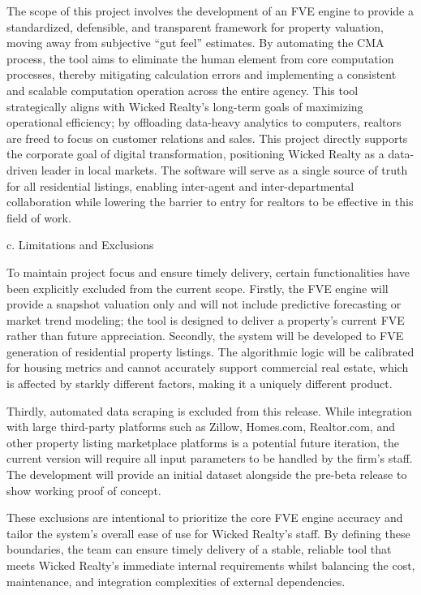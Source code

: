 \documentclass[
]{article}
\begin{document}
The scope of this project involves the development of an FVE engine to
provide a standardized, defensible, and transparent framework for
property valuation, moving away from subjective ``gut feel'' estimates.
By automating the CMA process, the tool aims to eliminate the human
element from core computation processes, thereby mitigating calculation
errors and implementing a consistent and scalable computation operation
across the entire agency. This tool strategically aligns with Wicked
Realty's long-term goals of maximizing operational efficiency; by
offloading data-heavy analytics to computers, realtors are freed to
focus on customer relations and sales. This project directly supports
the corporate goal of digital transformation, positioning Wicked Realty
as a data-driven leader in local markets. The software will serve as a
single source of truth for all residential listings, enabling
inter-agent and inter-departmental collaboration while lowering the
barrier to entry for realtors to be effective in this field of work.

c. Limitations and Exclusions

To maintain project focus and ensure timely delivery, certain
functionalities have been explicitly excluded from the current scope.
Firstly, the FVE engine will provide a snapshot valuation only and will
not include predictive forecasting or market trend modeling; the tool is
designed to deliver a property's current FVE rather than future
appreciation. Secondly, the system will be developed to FVE generation
of residential property listings. The algorithmic logic will be
calibrated for housing metrics and cannot accurately support commercial
real estate, which is affected by starkly different factors, making it a
uniquely different product.

Thirdly, automated data scraping is excluded from this release. While
integration with large third-party platforms such as Zillow, Homes.com,
Realtor.com, and other property listing marketplace platforms is a
potential future iteration, the current version will require all input
parameters to be handled by the firm's staff. The development will
provide an initial dataset alongside the pre-beta release to show
working proof of concept.

These exclusions are intentional to prioritize the core FVE engine
accuracy and tailor the system's overall ease of use for Wicked Realty's
staff. By defining these boundaries, the team can ensure timely delivery
of a stable, reliable tool that meets Wicked Realty's immediate internal
requirements whilst balancing the cost, maintenance, and integration
complexities of external dependencies.
\end{document}
